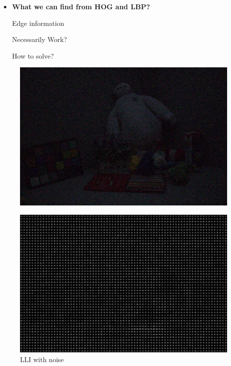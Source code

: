\documentclass[CJK,aspectratio=169]{beamer}  %
\begin{document}
\begin{frame}
		\begin{itemize} 
			\item \textbf{What we can find from HOG and LBP?}
			\vspace{.3cm}
			
			\small Edge information
			
			\small Necessarily Work?
			
			\small How to solve?
			
		\end{itemize}
	\end{frame}
	
	\begin{frame}
		\begin{figure}
			\centering
			\begin{minipage}{.32\textwidth}
				\centering
				\includegraphics[width=.8\linewidth]{picture/LLIE/My Architecture/Edge Detection/low00269}
				\captionsetup{font=scriptsize}
				\label{fig: LLI1}
				\caption*{LLI with noise}
			\end{minipage}
			\begin{minipage}{.32\textwidth}
				\centering
				\includegraphics[width=.8\linewidth]{picture/LLIE/My Architecture/Edge Detection/low00269_hog}

\end{minipage}
\end{figure}
\end{frame}
\end{document}
